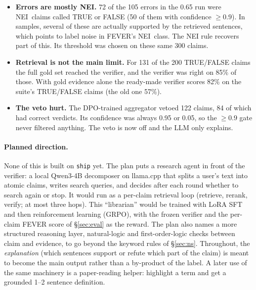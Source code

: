 \documentclass[11pt,a4paper]{article}
\makeatletter
\DeclareRobustCommand{\_}{\ifmmode\nfss@text{\textunderscore}\else\textunderscore\allowbreak\fi}
\newcommand{\NEI}{\textup{NEI}}
\makeatother
\begin{document}
\begin{itemize}
  \item \textbf{Errors are mostly \NEI.} 72 of the 105 errors in the 0.65 run were \NEI\ claims called TRUE or FALSE
        (50 of them with confidence $\ge 0.9$). In samples, several of these are actually supported by the retrieved
        sentences, which points to label noise in FEVER's \NEI\ class. The NEI rule recovers part of this. Its
        threshold was chosen on these same 300 claims.
  \item \textbf{Retrieval is not the main limit.} For 131 of the 200 TRUE/FALSE claims the full gold set reached the
        verifier, and the verifier was right on 85\% of those. With gold evidence alone the ready-made verifier
        scores 82\% on the suite's TRUE/FALSE claims (the old one 57\%).
  \item \textbf{The veto hurt.} The DPO-trained aggregator vetoed 122 claims, 84 of which had correct verdicts. Its
        confidence was always 0.95 or 0.05, so the $\ge 0.9$ gate never filtered anything. The veto is now off and the
        LLM only explains.
\end{itemize}

\paragraph{Planned direction.} None of this is built on \texttt{ship} yet. The plan puts a research agent in front
of the verifier: a local Qwen3-4B decomposer on llama.cpp that splits a user's text into atomic claims, writes search
queries, and decides after each round whether to search again or stop. It would run as a per-claim retrieval loop
(retrieve, rerank, verify; at most three hops). This ``librarian'' would be trained with LoRA SFT and then
reinforcement learning (GRPO), with the frozen verifier and the per-claim FEVER score of \S\ref{sec:eval} as the
reward. The plan also names a more structured reasoning layer, natural-logic and first-order-logic checks between
claim and evidence, to go beyond the keyword rules of \S\ref{sec:ns}. Throughout, the \emph{explanation} (which
sentences support or refute which part of the claim) is meant to become the main output rather than a by-product
of the label. A later use of the same machinery is a paper-reading helper: highlight a term and get a grounded
1--2 sentence definition.
\end{document}
